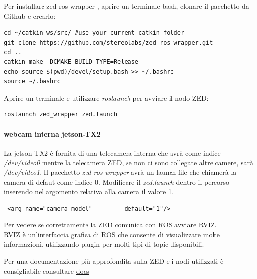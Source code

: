 \documentclass[a4paper]{article}
\begin{document}
Per installare zed-ros-wrapper , aprire un terminale bash, clonare il pacchetto da Github e crearlo:
\begin{verbatim}
cd ~/catkin_ws/src/ #use your current catkin folder
git clone https://github.com/stereolabs/zed-ros-wrapper.git
cd ..
catkin_make -DCMAKE_BUILD_TYPE=Release
echo source $(pwd)/devel/setup.bash >> ~/.bashrc
source ~/.bashrc
\end{verbatim}

Aprire un terminale e utilizzare \textit{roslaunch} per avviare il nodo ZED:

\begin{verbatim}
roslaunch zed_wrapper zed.launch
\end{verbatim}

\paragraph{webcam interna jetson-TX2}
La jetson-TX2 è fornita di una telecamera interna che avrà come indice \textit{/dev/video0} mentre la telecamera ZED, se non ci sono collegate altre camere, sarà \textit{/dev/video1}. Il pacchetto \textit{zed-ros-wrapper} avrà un launch file che chiamerà la camera di defaut come indice 0. Modificare il \textit{zed.launch} dentro il percorso   inserendo nel argomento relativa alla camera il valore 1.
\begin{verbatim}
 <arg name="camera_model"         default="1"/>
\end{verbatim}

Per vedere se correttamente la ZED comunica con ROS avviare RVIZ.
\\
RVIZ è un'interfaccia grafica di ROS che consente di visualizzare molte informazioni, utilizzando plugin per molti tipi di topic disponibili.





Per una documentazione più approfondita sulla ZED e i nodi utilizzati è consigliabile consultare 
\textcolor{red}{\href{https://www.stereolabs.com/docs/getting-started/}{docs}}
\end{document}
